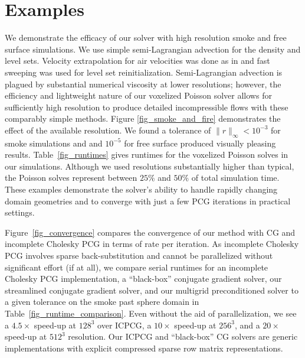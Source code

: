 \section{Examples}
We demonstrate the efficacy of our solver with high resolution smoke and free surface simulations. We use simple semi-Lagrangian advection \cite{Stam:1999:SF} for the density and level
sets. Velocity extrapolation for air velocities was done as in \cite{zhu:2005:sand} and fast sweeping \cite{Z04} was used for level set reinitialization. Semi-Lagrangian advection 
is plagued by substantial numerical viscosity at lower resolutions; however, the efficiency and lightweight nature of our voxelized Poisson solver allows for sufficiently high resolution
to produce detailed incompressible flows with these comparably simple methods. Figure \ref{fig_smoke_and_fire} demonstrates the effect of the available resolution.  We found a tolerance of $\|r\|_{\infty}<10^{-3}$ for smoke simulations and and $10^{-5}$ for free surface produced visually pleasing results.
Table~\ref{fig_runtimes} gives runtimes for the voxelized Poisson solves in our simulations.  Although we used resolutions substantially higher than typical, the Poisson solves represent between $25\%$ and $50\%$ of total simulation time. 
These examples demonstrate the solver's ability to handle rapidly changing domain geometries and to converge with just a few PCG iterations in practical
settings. 

Figure~\ref{fig_convergence} compares the convergence of our method with CG and incomplete Cholesky PCG in terms of rate per iteration. As incomplete Cholesky PCG involves sparse back-substitution and cannot be parallelized without significant effort (if at all), we compare serial runtimes for an incomplete Cholesky PCG implementation, a ``black-box'' conjugate gradient solver, our streamlined conjugate gradient solver, and our multigrid preconditioned solver to a given tolerance on the smoke past sphere domain in Table~\ref{fig_runtime_comparison}.  Even without the aid of parallelization, we see a $4.5\times$ speed-up at $128^3$ over ICPCG, a $10\times$ speed-up at $256^3$, and a $20\times$ speed-up at $512^3$ resolution.  Our ICPCG and ``black-box'' CG solvers are generic implementations with explicit compressed sparse row matrix representations.

